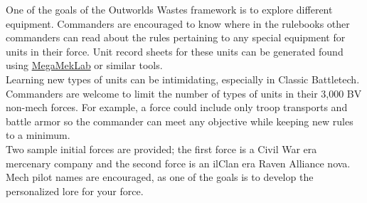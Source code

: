 \documentclass[UTF8]{article}
\begin{document}
One of the goals of the Outworlds Wastes framework is to explore different equipment.
Commanders are encouraged to know where in the rulebooks other commanders can read about the rules pertaining to any special equipment for units in their force.
Unit record sheets for these units can be generated found using \href{https://megamek.org/}{MegaMekLab} or similar tools.\\

Learning new types of units can be intimidating, especially in Classic Battletech.
Commanders are welcome to limit the number of types of units in their 3,000 BV non-mech forces.
For example, a force could include only troop transports and battle armor so the commander can meet any objective while keeping new rules to a minimum.\\

Two sample initial forces are provided; the first force is a Civil War era mercenary company and the second force is an ilClan era Raven Alliance nova.
Mech pilot names are encouraged, as one of the goals is to develop the personalized lore for your force.\\

\newpage
\end{document}
